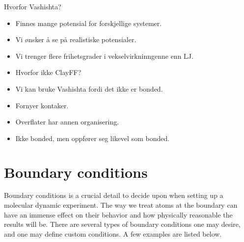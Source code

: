 \documentclass[twoside,english]{uiofysmaster}
\begin{document}
Hvorfor Vashishta?
\begin{itemize}
	\item Finnes mange potensial for forskjellige systemer.
	\item Vi ønsker å se på realistiske potensialer.
	\item Vi trenger flere frihetsgrader i vekselvirkninngenne enn LJ. 
	\item Hvorfor ikke ClayFF?
	\item Vi kan bruke Vashishta fordi det ikke er bonded.
	\item Fornyer kontaker.
	\item Overflater har annen organisering.
	\item Ikke bonded, men oppfører seg likevel som bonded.
\end{itemize}



\section{Boundary conditions}
Boundary conditions is a crucial detail to decide upon when setting up a molecular dynamic experiment. The way we treat atoms at the boundary can have an immense effect on their behavior and how physically reasonable the results will be. There are several types of boundary conditions one may desire, and one may define custom conditions. A few examples are listed below. 
 
\end{document}
